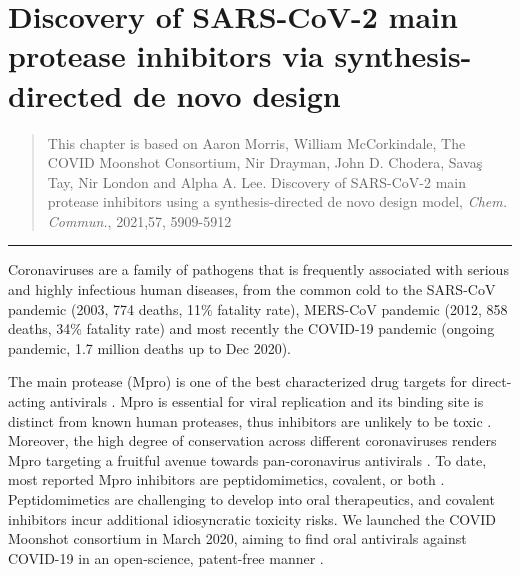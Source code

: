 \chapter{Discovery of SARS-CoV-2 main protease inhibitors via synthesis-directed de novo design} \label{ch:ranking}

\begin{quote}
    This chapter is based on Aaron Morris, William McCorkindale, The COVID Moonshot Consortium, Nir Drayman, John D. Chodera, Savaş Tay, Nir London and Alpha A. Lee. Discovery of SARS-CoV-2 main protease inhibitors using a synthesis-directed de novo design model, \textit{Chem. Commun.}, 2021,57, 5909-5912 
\end{quote}

\noindent\hfil\rule{0.5\textwidth}{.4pt}\hfil


Coronaviruses are a family of pathogens that is frequently associated with serious and highly infectious human diseases, from the common cold to the SARS-CoV pandemic (2003, 774 deaths, 11\% fatality rate), MERS-CoV pandemic (2012, 858 deaths, 34\% fatality rate) and most recently the COVID-19 pandemic (ongoing pandemic, 1.7 million deaths up to Dec 2020).

The main protease (Mpro) is one of the best characterized drug targets for direct-acting antivirals \cite{pillaiyar2016overview,cannalire2020targeting}. Mpro is essential for viral replication and its binding site is distinct from known human proteases, thus inhibitors are unlikely to be toxic \cite{jin2020structure,liu2020development}. Moreover, the high degree of conservation across different coronaviruses renders Mpro targeting a fruitful avenue towards pan-coronavirus antivirals \cite{ullrich2020sars}. To date, most reported Mpro inhibitors are peptidomimetics, covalent, or both \cite{cannalire2020targeting}. Peptidomimetics are challenging to develop into oral therapeutics, and covalent inhibitors incur additional idiosyncratic toxicity risks. We launched the COVID Moonshot consortium in March 2020, aiming to find oral antivirals against COVID-19 in an open-science, patent-free manner \cite{chodera2020crowdsourcing}.

